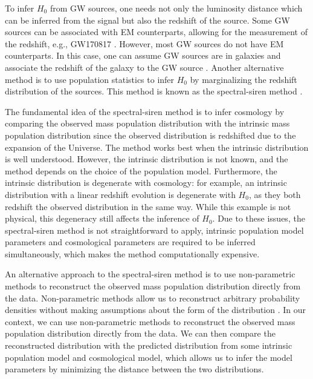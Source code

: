 \documentclass[sn-aps, pdflatex]{sn-jnl}
\begin{document}
To infer $H_0$ from \ac{GW} sources, one needs not only the luminosity distance which can be inferred from the signal but also the redshift of the source.
Some \ac{GW} sources can be associated with \ac{EM} counterparts, allowing for the measurement of the redshift, e.g., GW170817 \citep{LIGOScientific:2017adf, Guidorzi:2017ogy}.
However, most \ac{GW} sources do not have \ac{EM} counterparts.
In this case, one can assume \ac{GW} sources are in galaxies and associate the redshift of the galaxy to the \ac{GW} source \citep{Schutz:1986gp, DelPozzo:2011vcw, Gray:2019ksv, Gray:2023wgj}.
Another alternative method is to use population statistics to infer $H_0$ by marginalizing the redshift distribution of the sources.
This method is known as the spectral-siren method \citep{You:2020wju, Mastrogiovanni:2021wsd, LIGOScientific:2021aug, Ezquiaga:2022zkx}.

The fundamental idea of the spectral-siren method is to infer cosmology by comparing the observed mass population distribution with the intrinsic mass population distribution since the observed distribution is redshifted due to the expansion of the Universe.
The method works best when the intrinsic distribution is well understood.
However, the intrinsic distribution is not known, and the method depends on the choice of the population model.
Furthermore, the intrinsic distribution is degenerate with cosmology: for example, an intrinsic distribution with a linear redshift evolution is degenerate with $H_0$, as they both redshift the observed distribution in the same way.
While this example is not physical, this degeneracy still affects the inference of $H_0$.
Due to these issues, the spectral-siren method is not straightforward to apply, intrinsic population model parameters and cosmological parameters are required to be inferred simultaneously, which makes the method computationally expensive.

An alternative approach to the spectral-siren method is to use non-parametric methods to reconstruct the observed mass population distribution directly from the data.
Non-parametric methods allow us to reconstruct arbitrary probability densities without making assumptions about the form of the distribution \citep{Rinaldi:2021bhm}.
In our context, we can use non-parametric methods to reconstruct the observed mass population distribution directly from the data.
We can then compare the reconstructed distribution with the predicted distribution from some intrinsic population model and cosmological model, which allows us to infer the model parameters by minimizing the distance between the two distributions.
\end{document}
